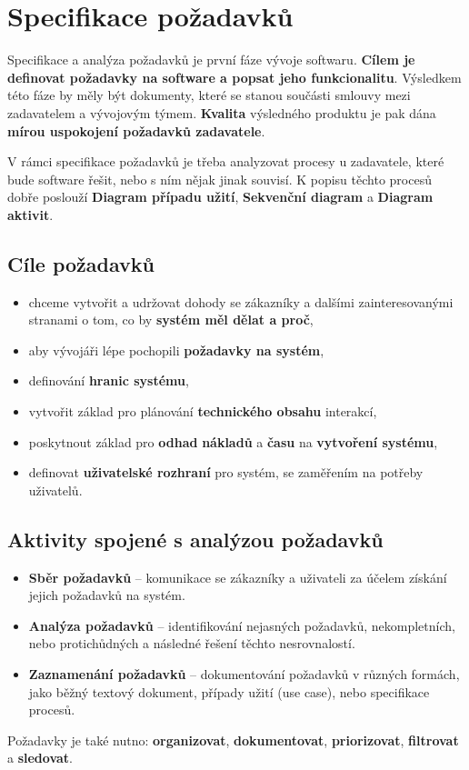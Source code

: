 \section{Specifikace požadavků}
Specifikace a analýza požadavků je první fáze vývoje softwaru. \textbf{Cílem je definovat požadavky na software a popsat jeho funkcionalitu}. Výsledkem této fáze by měly být dokumenty, které se stanou součásti smlouvy mezi zadavatelem a vývojovým týmem. \textbf{Kvalita} výsledného produktu je pak dána \textbf{mírou uspokojení požadavků zadavatele}.

V rámci specifikace požadavků je třeba analyzovat procesy u zadavatele, které bude software řešit, nebo s ním nějak jinak souvisí. K popisu těchto procesů dobře poslouží \textbf{Diagram případu užití}, \textbf{Sekvenční diagram} a \textbf{Diagram aktivit}.

\subsection{Cíle požadavků}
\begin{itemize}
    \item chceme vytvořit a udržovat dohody se zákazníky a dalšími zainteresovanými stranami o tom, co by \textbf{systém měl dělat a proč},
    \item aby vývojáři lépe pochopili \textbf{požadavky na systém},
    \item definování \textbf{hranic systému},
    \item vytvořit základ pro plánování \textbf{technického obsahu} interakcí,
    \item poskytnout základ pro \textbf{odhad} \textbf{nákladů} a \textbf{času} na \textbf{vytvoření systému},
    \item definovat \textbf{uživatelské rozhraní} pro systém, se zaměřením na potřeby uživatelů.
\end{itemize}

\subsection{Aktivity spojené s analýzou požadavků}
\begin{itemize}
    \item \textbf{Sběr požadavků} --  komunikace se zákazníky a uživateli za účelem získání jejich požadavků na systém.
    \item \textbf{Analýza požadavků} -- identifikování nejasných požadavků, nekompletních, nebo protichůdných a následné řešení těchto nesrovnalostí.
    \item \textbf{Zaznamenání požadavků} -- dokumentování požadavků v různých formách, jako běžný textový dokument, případy užití (use case), nebo specifikace procesů.
\end{itemize}
Požadavky je také nutno: \textbf{organizovat}, \textbf{dokumentovat}, \textbf{priorizovat}, \textbf{filtrovat} a \textbf{sledovat}.

